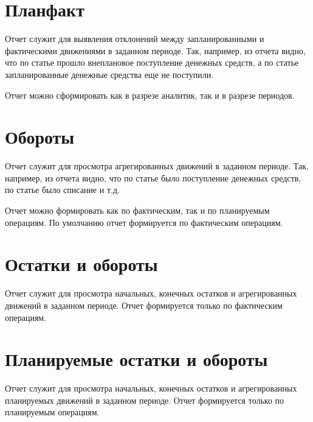\documentclass[a4paper,10pt,russian]{sphinxmanual}
\begin{document}
\section{План\sphinxhyphen{}факт}
\label{\detokenize{reports:id3}}
\sphinxAtStartPar
Отчет служит для выявления отклонений между запланированными и фактическими движениями в заданном периоде. Так, например,
из отчета видно, что по статье  прошло внеплановое поступление денежных средств,
а по статье 
запланированные денежные средства еще не поступили.

\sphinxAtStartPar
Отчет можно сформировать как в разрезе аналитик, так и в разрезе периодов.


\section{Обороты}
\label{\detokenize{reports:id4}}
\sphinxAtStartPar
Отчет служит для просмотра агрегированных движений в заданном периоде. Так, например,
из отчета видно, что по статье  было поступление денежных средств, по статье 
было списание и т.д.

\sphinxAtStartPar
Отчет можно формировать как по фактическим, так и по планируемым операциям. По умолчанию отчет формируется
по фактическим операциям.


\section{Остатки и обороты}
\label{\detokenize{reports:id5}}
\sphinxAtStartPar
Отчет служит для просмотра начальных, конечных остатков и агрегированных движений в заданном периоде. Отчет формируется
только по фактическим операциям.

\noindent{}

\noindent{}

\noindent{}


\section{Планируемые остатки и обороты}
\label{\detokenize{reports:id6}}
\sphinxAtStartPar
Отчет служит для просмотра начальных, конечных остатков и агрегированных планируемых движений в заданном периоде. Отчет формируется
только по планируемым операциям.
\end{document}
